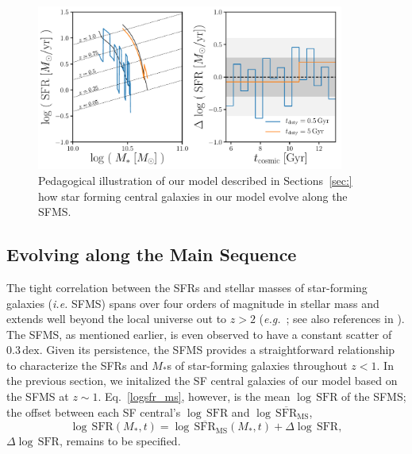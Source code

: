 \documentclass[12pt, letterpaper, preprint]{aastex}
\newcommand{\beq}{\begin{equation}}
\newcommand{\eeq}{\end{equation}}
\newcommand{\logsfr}{\log \, \mathrm{SFR}}
\begin{document}
\begin{figure}
\begin{center}
\includegraphics[width=0.9\textwidth]{figs/sfh_pedagogical.pdf}
    \caption{Pedagogical illustration of our model described in Sections~\ref{sec:}
    how star forming central galaxies in our model
evolve along the SFMS.}
\label{fig:sfh_model}
\end{center}
\end{figure}

\subsection{Evolving along the Main Sequence} 
The tight correlation between the SFRs and stellar masses of star-forming 
galaxies (\emph{i.e.} SFMS) spans over four orders of magnitude in stellar 
mass and extends well beyond the local universe out to $z > 2$ 
(\emph{e.g.}~\citealt{noeske2007,daddi2007,elbaz2007,salim2007,santini2009,karim2011,whitaker2012,moustakas2013,lee2015}; see also references in \citealt{speagle2014}). 
The SFMS, as mentioned earlier, is even observed to have a constant scatter
of $0.3\,\mathrm{dex}$. Given its persistence, the SFMS provides a straightforward
relationship to characterize the SFRs and $M_*$s of star-forming galaxies 
throughout $z < 1$. In the previous section, we initalized the SF central 
galaxies of our model based on the SFMS at $z \sim 1$. Eq.~\ref{logsfr_ms}, 
however, is the mean $\logsfr$ of the SFMS; the offset between each SF 
central's $\logsfr$ and $\log\,\overline{\mathrm{SFR}}_\mathrm{MS}$, 
\beq \label{eq:logsfr_sf} 
\logsfr(M_*, t) = \log\,\overline{\mathrm{SFR}}_\mathrm{MS}(M_*, t) + \Delta \logsfr,
\eeq
$\Delta \logsfr$, remains to be specified.  
\end{document}
